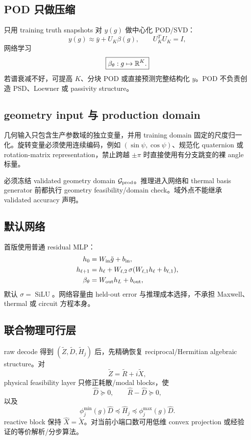 \subsection{POD 只做压缩}
只用 training truth snapshots 对 $y(g)$ 做中心化 POD/SVD：
\begin{equation}
y(g)\approx\bar y+U_K\beta(g),\qquad U_K^TU_K=I,
\end{equation}
网络学习
\begin{equation}
\boxed{\beta_\theta:g\mapsto\mathbb{R}^K.}
\end{equation}
若谱衰减不好，可提高 $K$、分块 POD 或直接预测完整结构化 $y$。POD 不负责创造 PSD、Loewner 或 passivity structure。

\subsection{geometry input 与 production domain}
几何输入只包含生产参数域的独立变量，并用 training domain 固定的尺度归一化。旋转变量必须使用连续编码，例如 $(\sin\psi,\cos\psi)$、规范化 quaternion 或 rotation-matrix representation，禁止跨越 $\pm\pi$ 时直接使用有分支跳变的裸 angle 标量。

必须冻结 validated geometry domain $\mathcal G_{\rm prod}$。推理进入网络和 thermal basis generator 前都执行 geometry feasibility/domain check。域外点不能继承 validated accuracy 声明。

\subsection{默认网络}
首版使用普通 residual MLP：
\begin{align}
h_0 &= W_{\rm in}\tilde g+b_{\rm in},\\
h_{\ell+1}
&=h_\ell+W_{\ell,2}\,\sigma(W_{\ell,1}h_\ell+b_{\ell,1}),\\
\beta_\theta&=W_{\rm out}h_L+b_{\rm out},
\end{align}
默认 $\sigma=\operatorname{SiLU}$。网络容量由 held-out error 与推理成本选择，不承担 Maxwell、thermal 或 circuit 方程本身。

\subsection{联合物理可行层}
raw decode 得到 $(\widetilde Z,\widetilde D,\widetilde H_j)$ 后，先精确恢复 reciprocal/Hermitian algebraic structure。对
\begin{equation}
\widetilde Z=\widetilde R+i\widetilde X,
\end{equation}
physical feasibility layer 只修正耗散/modal blocks，使
\begin{equation}
\widehat D\succeq0,
\qquad
\widehat R-\widehat D\succeq0,
\end{equation}
以及
\begin{equation}
\boxed{
\phi_j^{\min}(g)\widehat D
\preceq\widehat H_j
\preceq\phi_j^{\max}(g)\widehat D.
}
\end{equation}
reactive block 保持 $\widehat X=\widetilde X$。对当前小端口数可用低维 convex projection 或经验证的等价解析/分步算法。


